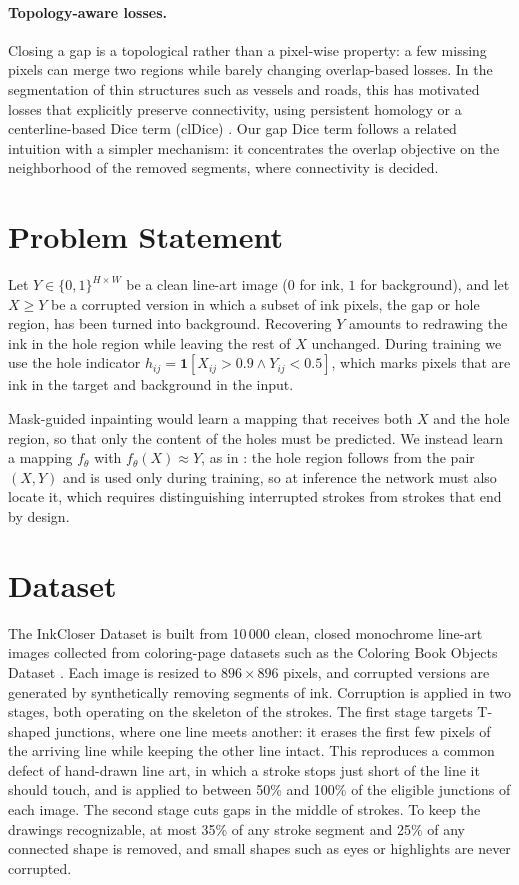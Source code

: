 \documentclass[pdflatex,sn-mathphys-num]{sn-jnl}%
\begin{document}
\paragraph{Topology-aware losses.}
Closing a gap is a topological rather than a pixel-wise property: a few missing
pixels can merge two regions while barely changing overlap-based losses. In the
segmentation of thin structures such as vessels and roads, this has motivated
losses that explicitly preserve connectivity, using persistent homology
\citep{hu2019topology} or a centerline-based Dice term (clDice)
\citep{shit2021cldice}. Our gap Dice term follows a related intuition with a
simpler mechanism: it concentrates the overlap objective on the neighborhood of the
removed segments, where connectivity is decided.

\section{Problem Statement}  
\label{sec:problem}

Let $Y \in \{0,1\}^{H \times W}$ be a clean line-art image ($0$ for ink, $1$ for
background), and let $X \ge Y$ be a corrupted version in which a subset of ink
pixels, the gap or hole region, has been turned into background. Recovering $Y$
amounts to redrawing the ink in the hole region while leaving the rest of $X$ unchanged. During training we use the hole indicator $h_{ij} = \mathbf{1}[X_{ij} > 0.9 \wedge Y_{ij} < 0.5]$, which marks pixels that are ink in the target and background in the input.

Mask-guided inpainting would learn a mapping that receives both $X$ and the hole
region, so that only the content of the holes must be predicted. We instead learn
a mapping $f_\theta$ with $f_\theta(X) \approx Y$, as in \citet{sasaki2017joint}:
the hole region follows from the pair $(X, Y)$ and is used only during training,
so at inference the network must also locate it, which requires distinguishing
interrupted strokes from strokes that end by design.

\section{Dataset}
\label{sec:dataset}

The InkCloser Dataset is built from 10\,000 clean, closed monochrome line-art images
collected from coloring-page datasets such as the Coloring Book Objects Dataset
\citep{chen2019human}. Each image is resized to $896 \times 896$ pixels, and
corrupted versions are generated by synthetically removing segments of ink.
Corruption is applied in two stages, both operating on the skeleton of the strokes.
The first stage targets T-shaped junctions, where one line meets another: it erases
the first few pixels of the arriving line while keeping the other line intact. This
reproduces a common defect of hand-drawn line art, in which a stroke stops just
short of the line it should touch, and is applied to between 50\% and 100\% of the
eligible junctions of each image. The second stage cuts gaps in the middle of
strokes. To keep the drawings recognizable, at most 35\% of any stroke segment and
25\% of any connected shape is removed, and small shapes such as eyes or highlights
are never corrupted.
\end{document}
